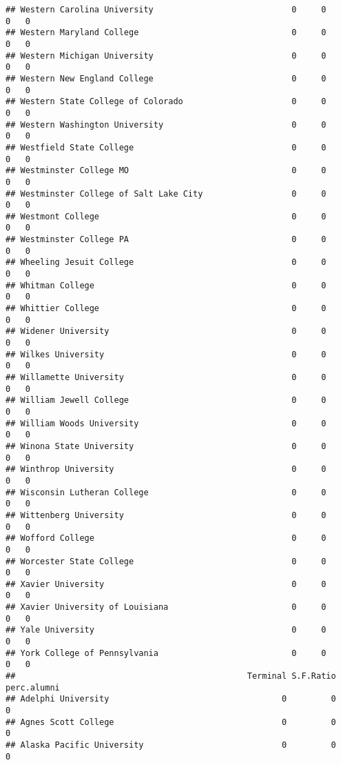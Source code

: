 \documentclass[
]{article}
\begin{document}
\begin{verbatim}
## Western Carolina University                            0     0        0   0
## Western Maryland College                               0     0        0   0
## Western Michigan University                            0     0        0   0
## Western New England College                            0     0        0   0
## Western State College of Colorado                      0     0        0   0
## Western Washington University                          0     0        0   0
## Westfield State College                                0     0        0   0
## Westminster College MO                                 0     0        0   0
## Westminster College of Salt Lake City                  0     0        0   0
## Westmont College                                       0     0        0   0
## Westminster College PA                                 0     0        0   0
## Wheeling Jesuit College                                0     0        0   0
## Whitman College                                        0     0        0   0
## Whittier College                                       0     0        0   0
## Widener University                                     0     0        0   0
## Wilkes University                                      0     0        0   0
## Willamette University                                  0     0        0   0
## William Jewell College                                 0     0        0   0
## William Woods University                               0     0        0   0
## Winona State University                                0     0        0   0
## Winthrop University                                    0     0        0   0
## Wisconsin Lutheran College                             0     0        0   0
## Wittenberg University                                  0     0        0   0
## Wofford College                                        0     0        0   0
## Worcester State College                                0     0        0   0
## Xavier University                                      0     0        0   0
## Xavier University of Louisiana                         0     0        0   0
## Yale University                                        0     0        0   0
## York College of Pennsylvania                           0     0        0   0
##                                               Terminal S.F.Ratio perc.alumni
## Adelphi University                                   0         0           0
## Agnes Scott College                                  0         0           0
## Alaska Pacific University                            0         0           0

\end{verbatim}
\end{document}
